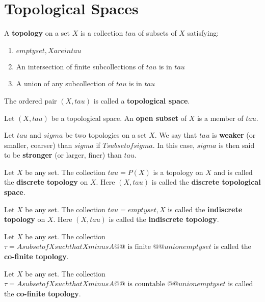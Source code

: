 \section{Topological Spaces}

\begin{defn}
A \textbf{topology} on a set $X$ is a collection $tau$ of subsets of $X$ satisfying:
    \begin{enumerate}
        \item $empty set, X are in tau$
        \item  An intersection of finite subcollections of $tau$ is in $tau$
        \item A union of any subcollection of $tau$ is in $tau$
    \end{enumerate}
The ordered pair $(X, tau)$ is called a \textbf{topological space}.
\end{defn}


\begin{defn}
    Let $(X, tau)$ be a topological space. An \textbf{open subset} of $X$ is a member of $tau$.
\end{defn}

\begin{defn}
Let $tau$ and $sigma$ be two topologies on a set $X$. We say that $tau$ is \textbf{weaker} (or smaller, coarser) than $sigma$ if $T subset of sigma$. In this case, $sigma$ is then said to be \textbf{stronger} (or larger, finer) than $tau$.
\end{defn}

\begin{defn}
Let $X$ be any set. The collection $tau = P(X)$ is a topology on $X$ and is called the \textbf{discrete topology} on $X$. Here $(X, tau)$ is called the \textbf{discrete topological space}.
\end{defn}

\begin{defn}
Let $X$ be any set. The collection $tau = {{ empty set, X }}$ is called the \textbf{indiscrete topology} on $X$. Here $(X, tau)$ is called the \textbf{indiscrete topology}.
\end{defn}

\begin{defn}
    Let $X$ be any set. The collection $\tau = {{ A subset of X such that X minus A @@\text{ is finite }@@ }} union {{ empty set }}$ is called the \textbf{co-finite topology}.
\end{defn}

\begin{defn}
    Let $X$ be any set. The collection $\tau = {{ A subset of X such that X minus A @@\text{ is countable }@@ }} union {{ empty set }}$ is called the \textbf{co-finite topology}.
\end{defn}




